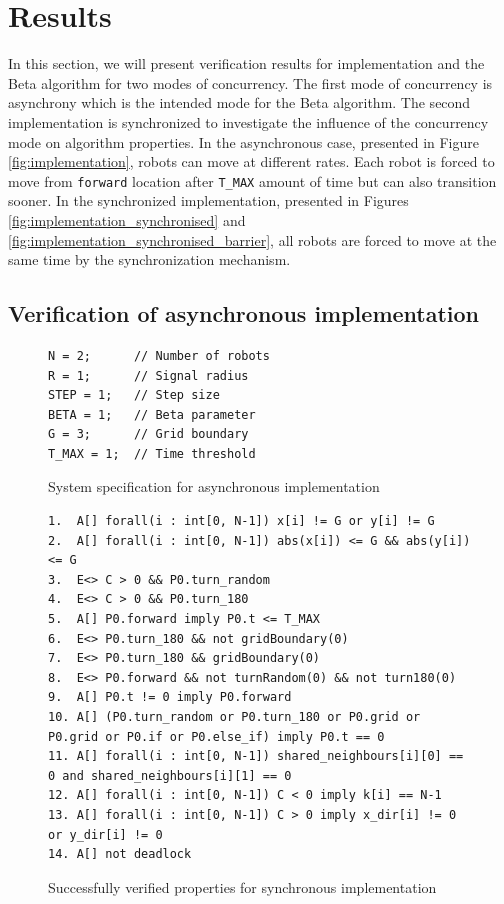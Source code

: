 \section{Results}
In this section, we will present verification results for implementation and the Beta algorithm for two modes of concurrency. The first mode of concurrency is asynchrony which is the intended mode for the Beta algorithm. The second implementation is synchronized to investigate the influence of the concurrency mode on algorithm properties. In the asynchronous case, presented in Figure \ref{fig:implementation}, robots can move at different rates. Each robot is forced to move from \texttt{forward} location after \texttt{T\_MAX} amount of time but can also transition sooner. In the synchronized implementation, presented in Figures \ref{fig:implementation_synchronised} and \ref{fig:implementation_synchronised_barrier}, all robots are forced to move at the same time by the synchronization mechanism.



\subsection{Verification of asynchronous implementation}
\begin{figure}[H]
\caption{System specification for asynchronous implementation}
\label{fig:implementation_asynchronous_system}
\begin{lstlisting}[style=code]
N = 2;      // Number of robots
R = 1;      // Signal radius
STEP = 1;   // Step size
BETA = 1;   // Beta parameter
G = 3;      // Grid boundary
T_MAX = 1;  // Time threshold
\end{lstlisting}
\end{figure}

\begin{figure}[H]
\caption{Successfully verified properties for synchronous implementation}
\label{fig:implementation_asynchronous_properties}
\begin{lstlisting}[style=code]
1.  A[] forall(i : int[0, N-1]) x[i] != G or y[i] != G
2.  A[] forall(i : int[0, N-1]) abs(x[i]) <= G && abs(y[i]) <= G
3.  E<> C > 0 && P0.turn_random
4.  E<> C > 0 && P0.turn_180
5.  A[] P0.forward imply P0.t <= T_MAX
6.  E<> P0.turn_180 && not gridBoundary(0)
7.  E<> P0.turn_180 && gridBoundary(0)
8.  E<> P0.forward && not turnRandom(0) && not turn180(0)
9.  A[] P0.t != 0 imply P0.forward
10. A[] (P0.turn_random or P0.turn_180 or P0.grid or P0.grid or P0.if or P0.else_if) imply P0.t == 0
11. A[] forall(i : int[0, N-1]) shared_neighbours[i][0] == 0 and shared_neighbours[i][1] == 0
12. A[] forall(i : int[0, N-1]) C < 0 imply k[i] == N-1
13. A[] forall(i : int[0, N-1]) C > 0 imply x_dir[i] != 0 or y_dir[i] != 0
14. A[] not deadlock
\end{lstlisting}    
\end{figure}

